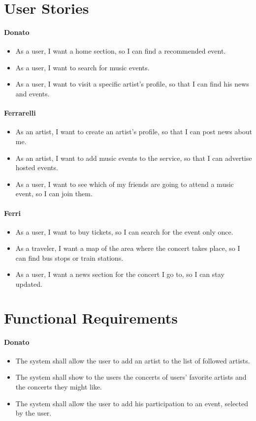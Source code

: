\documentclass[11pt,a4paper]{article}
\begin{document}
\section{User Stories}
\paragraph{Donato}
\begin{itemize}
\item As a user, I want a home section, so I can find a recommended event. 
\item As a user, I want to search for music events.
\item As a user, I want to visit a specific artist’s profile, so that I can find his news and events.
\end{itemize}
\paragraph{Ferrarelli}
\begin{itemize}
\item As an artist, I want to create an artist’s profile, so that I can post news about me.
\item As an artist, I want to add music events to the service, so that I can advertise hosted events.
\item As a user, I want to see which of my friends are going to attend a music event, so I can join them.
\end{itemize}
\paragraph{Ferri}
\begin{itemize}
\item As a user, I want to buy tickets, so I can search for the event only once.
\item As a traveler, I want a map of the area where the concert takes place, so I can
find bus stops or train stations. 
\item As a user, I want a news section for the concert I go to, so I can stay updated.
\end{itemize}
\section{Functional Requirements}
\paragraph{Donato}
\begin{itemize}
\item The system shall allow the user to add an artist to the list of followed artists.
\item The system shall show to the users the concerts of users’ favorite artists and the concerts they might like.
\item The system shall allow the user to add his participation to an event, selected by the user.
\end{itemize}
\end{document}
